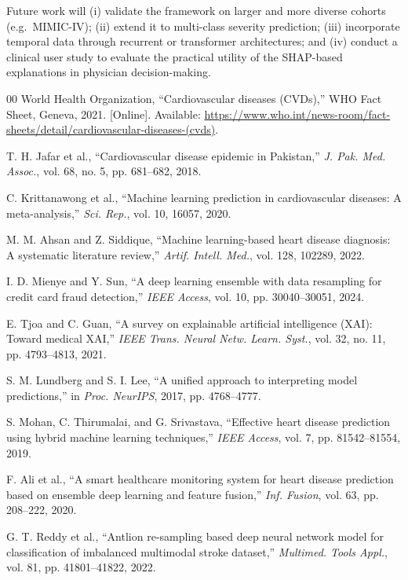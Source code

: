\documentclass[conference]{IEEEtran}
\begin{document}
Future work will (i) validate the framework on larger and more diverse cohorts (e.g.\ MIMIC-IV); (ii) extend it to multi-class severity prediction; (iii) incorporate temporal data through recurrent or transformer architectures; and (iv) conduct a clinical user study to evaluate the practical utility of the SHAP-based explanations in physician decision-making.

\begin{thebibliography}{00}
World Health Organization, ``Cardiovascular diseases (CVDs),'' WHO Fact Sheet, Geneva, 2021. [Online]. Available: \url{https://www.who.int/news-room/fact-sheets/detail/cardiovascular-diseases-(cvds)}.

T. H. Jafar et al., ``Cardiovascular disease epidemic in Pakistan,'' \emph{J. Pak. Med. Assoc.}, vol. 68, no. 5, pp. 681--682, 2018.

C. Krittanawong et al., ``Machine learning prediction in cardiovascular diseases: A meta-analysis,'' \emph{Sci. Rep.}, vol. 10, 16057, 2020.

M. M. Ahsan and Z. Siddique, ``Machine learning-based heart disease diagnosis: A systematic literature review,'' \emph{Artif. Intell. Med.}, vol. 128, 102289, 2022.

I. D. Mienye and Y. Sun, ``A deep learning ensemble with data resampling for credit card fraud detection,'' \emph{IEEE Access}, vol. 10, pp. 30040--30051, 2024.

E. Tjoa and C. Guan, ``A survey on explainable artificial intelligence (XAI): Toward medical XAI,'' \emph{IEEE Trans. Neural Netw. Learn. Syst.}, vol. 32, no. 11, pp. 4793--4813, 2021.

S. M. Lundberg and S. I. Lee, ``A unified approach to interpreting model predictions,'' in \emph{Proc. NeurIPS}, 2017, pp. 4768--4777.

S. Mohan, C. Thirumalai, and G. Srivastava, ``Effective heart disease prediction using hybrid machine learning techniques,'' \emph{IEEE Access}, vol. 7, pp. 81542--81554, 2019.

F. Ali et al., ``A smart healthcare monitoring system for heart disease prediction based on ensemble deep learning and feature fusion,'' \emph{Inf. Fusion}, vol. 63, pp. 208--222, 2020.

G. T. Reddy et al., ``Antlion re-sampling based deep neural network model for classification of imbalanced multimodal stroke dataset,'' \emph{Multimed. Tools Appl.}, vol. 81, pp. 41801--41822, 2022.


\end{thebibliography}
\end{document}
